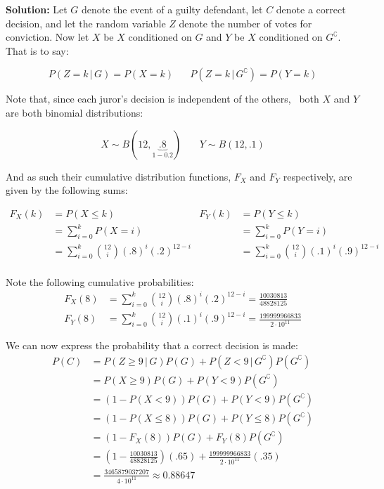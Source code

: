 \documentclass{article}
\newcommand*\pbar[0]{\,|\,}
\begin{document}
\noindent\textbf{Solution:} Let $G$ denote the event of a guilty defendant, let $C$ denote a correct decision, and let the random variable $Z$ denote the number of votes for conviction. Now let $X$ be $X$ conditioned on $G$ and $Y$ be $X$ conditioned on $G^\complement$. That is to say:

\begin{equation*}
    P(Z=k\pbar G)=P(X=k)\,\,\,\,\,\,\,\,\,\, P(Z=k\pbar G^\complement)=P(Y=k)
\end{equation*}

Note that, since each juror's decision is independent of the others, \ both $X$ and $Y$ are both binomial distributions:

\begin{equation*}
    X\sim B(12,\underbrace{.8}_{1-0.2})\,\,\,\,\,\,\,\,\,\,\, Y\sim B(12,.1)
\end{equation*}

And as such their cumulative distribution functions, $F_X$ and $F_Y$ respectively, are given by the following sums:

\begin{align*}
    F_X(k)&=P(X\le k) & F_Y(k)&=P(Y\le k)\\
    &=\sum_{i=0}^{k} P(X=i) & &=\sum_{i=0}^{k} P(Y=i)\\
    &=\sum_{i=0}^{k} \binom{12}{i}(.8)^i(.2)^{12-i} & &=\sum_{i=0}^{k} \binom{12}{i}(.1)^i(.9)^{12-i}\\
\end{align*}

Note the following cumulative probabilities:
\begin{align*}
    F_X(8)&=\sum_{i=0}^{k} \binom{12}{i}(.8)^i(.2)^{12-i}=\frac{10030813}{48828125}\\
    F_Y(8)&=\sum_{i=0}^{k} \binom{12}{i}(.1)^i(.9)^{12-i}=\frac{199999966833}{2\cdot10^{11}}
\end{align*}

We can now express the probability that a correct decision is made:
\begin{align*}
    P(C)&=P(Z\ge 9\pbar G)P(G)+P(Z<9\pbar G^\complement)P(G^\complement)\\
    &=P(X\ge 9)P(G)+P(Y<9)P(G^\complement)\tag{def. of $X$ and $Y$}\\
    &=(1-P(X<9))P(G)+P(Y<9)P(G^\complement)\tag{complement}\\
    &=(1-P(X\le 8))P(G)+P(Y\le 8)P(G^\complement)\tag{discrete random variable}\\
    &=(1-F_X(8))P(G)+F_Y(8)P(G^\complement)\tag{def. of cdf}\\
    &=\left(1-\frac{10030813}{48828125}\right)(.65)+\frac{199999966833}{2\cdot10^{11}}(.35)\\
    &=\frac{3465879037207}{4\cdot10^{11}}\approx 0.88647
\end{align*}
\end{document}
